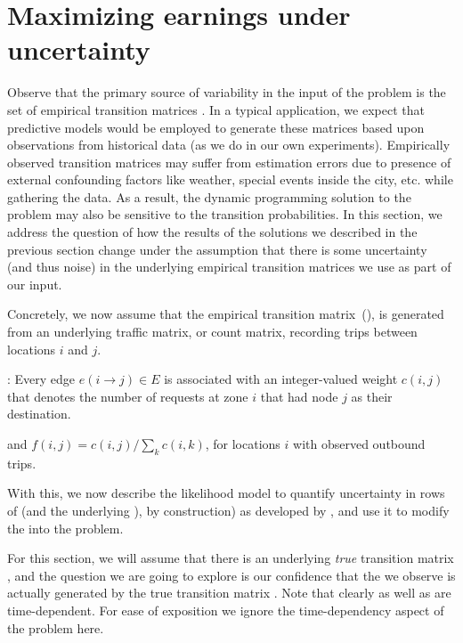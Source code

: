 

\section{Maximizing earnings under uncertainty}
\label{sec:sensitivity}
Observe that the primary source of variability in the input of the {\originalproblem} problem
is the set of empirical transition matrices {\empiricaltransitionmatrix}.  In a typical application,
we expect that predictive models would be employed to generate these matrices based upon observations
from historical data (as we do in our own experiments).  Empirically observed transition matrices may 
suffer from estimation errors due to presence of external confounding factors like weather, special 
events inside the city, etc. while gathering the data. As a result, the dynamic programming solution 
to the {\originalproblem} problem may also be sensitive to the transition probabilities. In this section, 
we address the question of how the results of the solutions we described in the previous section change 
under the assumption that there is some uncertainty (and thus noise) in the underlying empirical transition 
matrices we use as part of our input.

Concretely, we now assume that the empirical transition matrix~(\empiricaltransitionmatrix),  is generated from an 
underlying traffic matrix, or count matrix, recording trips between locations $i$ and $j$.

:
Every edge $e(i\rightarrow j) \in E$ is associated with an
integer-valued weight $c(i,j)$ that denotes the number of requests
at zone $i$ that had node $j$ as their destination.

and $f(i,j) = c(i,j) / \sum_k c(i,k)$, for locations $i$ with observed outbound trips. 



With this, we now describe the likelihood model to quantify uncertainty in rows of {\empiricaltransitionmatrix} 
(and the underlying {\countmatrix}), by construction) as developed by \citet{nilim2004robustness}, and 
use it to modify the {\originalproblem} into the {\robustproblem} problem.



For this section, we will assume that there is an underlying \emph{true} transition matrix
{\truetransitionmatrix}, and the question we are going to explore is 
our confidence that the
{\countmatrix} we observe is actually 
generated by the true transition matrix {\truetransitionmatrix}. Note that
clearly {\truetransitionmatrix} as well as {\countmatrix} are time-dependent. For ease of
exposition we ignore the time-dependency aspect of the problem here.

